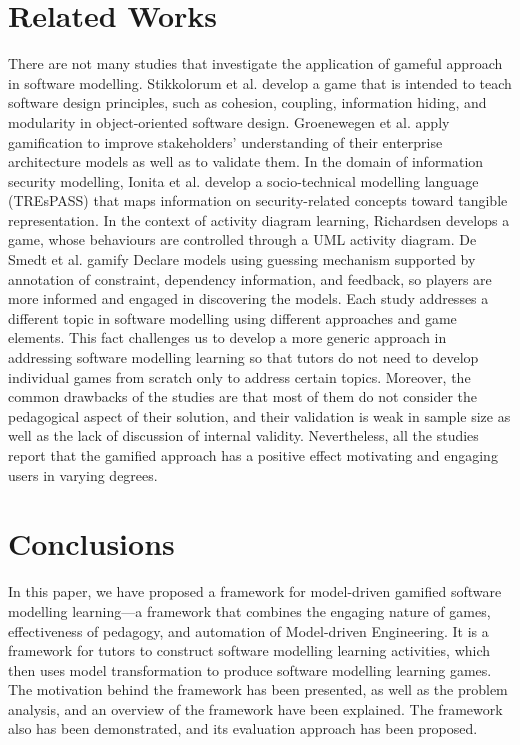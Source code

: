 \documentclass[conference]{IEEEtran}
\begin{document}
\section{Related Works}
\label{Related Works}
There are not many studies that investigate the application of gameful approach in software modelling. Stikkolorum et al. \cite{Stikkolorum2014} develop a game that is intended to teach software design principles, such as cohesion, coupling, information hiding, and modularity in object-oriented software design. Groenewegen et al. \cite{Groenewegen2010} apply gamification to improve stakeholders' understanding of their enterprise architecture models as well as to validate them. In the domain of information security modelling, Ionita et al.\cite{Ionita2015} develop a socio-technical modelling language (TREsPASS) that maps information on security-related concepts toward tangible representation. In the context of activity diagram learning, Richardsen \cite{Richardsen2014} develops a game, whose behaviours are controlled through a UML activity diagram. De Smedt et al. \cite{de2015gamification} gamify Declare models using guessing mechanism supported by annotation of constraint, dependency information, and feedback, so players are more informed and engaged in discovering the models. Each study addresses a different topic in software modelling using different approaches and game elements. This fact challenges us to develop a more generic approach in addressing software modelling learning so that tutors do not need to develop individual games from scratch only to address certain topics. Moreover, the common drawbacks of the studies are that most of them do not consider the pedagogical aspect of their solution, and their validation is weak in sample size as well as the lack of discussion of internal validity. Nevertheless, all the studies report that the gamified approach has a positive effect motivating and engaging users in varying degrees.

\section{Conclusions}
\label{Conclusions}
In this paper, we have proposed a framework for model-driven gamified software modelling learning---a framework that combines the engaging nature of games, effectiveness of pedagogy, and automation of Model-driven Engineering. It is a framework for tutors to construct software modelling learning activities, which then uses model transformation to produce software modelling learning games. The motivation behind the framework has been presented, as well as the problem analysis, and an overview of the framework have been explained. The framework also has been demonstrated, and its evaluation approach has been proposed.
\end{document}
